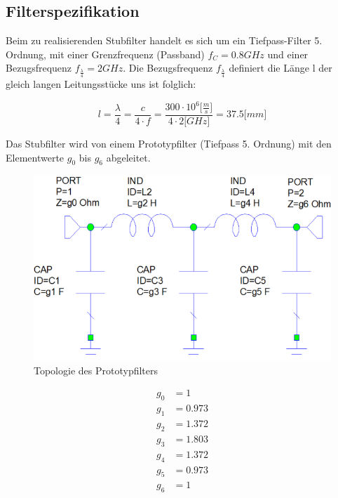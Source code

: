 \subsection{Filterspezifikation}

Beim zu realisierenden Stubfilter handelt es sich um ein Tiefpass-Filter 5. Ordnung, mit einer Grenzfrequenz (Passband) $f_C = 0.8GHz $ und einer Bezugsfrequenz $f_{\frac{\lambda}{4}} = 2GHz$. Die Bezugsfrequenz $f_{\frac{\lambda}{4}}$ definiert die Länge l der gleich langen Leitungsstücke uns ist folglich:

\begin{equation*}
l = \frac{\lambda}{4} = \frac{c}{4 \cdot f} = \frac{300\cdot 10^6 \lbrack\frac{m}{s}\rbrack}{4 \cdot 2 \lbrack GHz \rbrack} =37.5 \lbrack mm \rbrack
\end{equation*}

Das Stubfilter wird von einem Prototypfilter (Tiefpass 5. Ordnung) 
mit den Elementwerte $g_0$ bis $g_6$ abgeleitet.

\begin{figure}[h!]
\centering
 	\includegraphics[width=\imagewidth]{images/Topologie_Prototyp.png}
 	\caption{Topologie des Prototypfilters}
 	\label{fig:Topologie_Prototyp.png}
\end{figure}

\begin{mdframed}
    \begin{align*} 
        g_0 &= 1 \\ 
        g_1 &= 0.973 \\ 
        g_2 &= 1.372 \\ 
        g_3 &= 1.803 \\ 
        g_4 &= 1.372 \\ 
        g_5 &= 0.973 \\ 
        g_6 &= 1 \\ 
    \end{align*} 
\end{mdframed}

